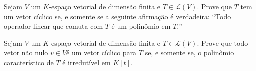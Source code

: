 \documentclass[11pt,a4paper]{article}
\begin{document}
 Sejam $V$ um $K$-espaço vetorial de dimensão finita e $T \in \mathcal{L}(V).$ Prove que $T$ tem um vetor cíclico se, e somente se a seguinte afirmação é verdadeira: ``Todo operador linear que comuta com $T$ é um polinômio em $T.$''


 Sejam $V$ um $K$-espaço vetorial de dimensão finita e $T \in \mathcal{L}(V).$ Prove que todo vetor não
nulo $v \in V $é um vetor cíclico para $T$ se, e somente se, o polinômio característico de $T$ é irredutível em $K[t].$

\solucao{}
\end{document}
